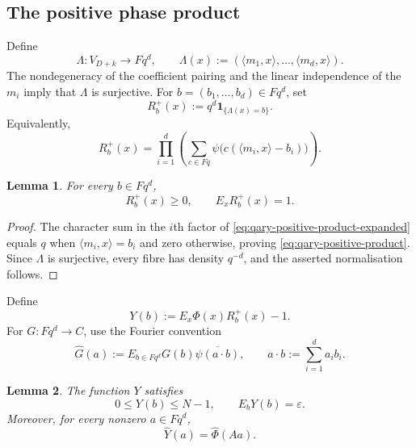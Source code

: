 \documentclass[11pt,reqno]{amsart}
\numberwithin{equation}{section}
\newtheorem{lemma}[lemma]{Lemma}
\theoremstyle{definition}
\theoremstyle{remark}
\newcommand{\Fq}{\mathbb F_q}
\newcommand{\E}{\mathbb E}
\newcommand{\one}{\mathbf 1}
\newcommand{\eps}{\varepsilon}
\newcommand{\wh}{\widehat}
\newcommand{\angles}[1]{\langle#1\rangle}
\def\Fq{Fq}%
\def\mathbb#1{#1}%
\begin{document}
\subsection{The positive phase product}

Define
\begin{equation}\label{eq:Lambda-def}
 \Lambda:V_{D+k}\longrightarrow\Fq^d,
 \qquad
 \Lambda(x):=
 (\angles{m_1,x},\ldots,\angles{m_d,x}).
\end{equation}
The nondegeneracy of the coefficient pairing and the linear independence of the $m_i$ imply that $\Lambda$ is surjective.  For $b=(b_1,\ldots,b_d)\in\Fq^d$, set
\begin{equation}\label{eq:qary-positive-product}
 R_b^+(x)
 :=q^d\one_{\{\Lambda(x)=b\}}.
\end{equation}
Equivalently,
\begin{equation}\label{eq:qary-positive-product-expanded}
 R_b^+(x)
 =\prod_{i=1}^d
 \left(
   \sum_{c\in\Fq}
   \psi\bigl(c(\angles{m_i,x}-b_i)\bigr)
 \right).
\end{equation}

\begin{lemma}\label{lem:qary-positive}
For every $b\in\Fq^d$,
\[
 R_b^+(x)\ge0,
 \qquad
 \E_xR_b^+(x)=1.
\]
\end{lemma}

\begin{proof}
The character sum in the $i$th factor of
\eqref{eq:qary-positive-product-expanded} equals $q$ when
$\angles{m_i,x}=b_i$ and zero otherwise, proving
\eqref{eq:qary-positive-product}.  Since $\Lambda$ is surjective, every fibre has density $q^{-d}$, and the asserted normalisation follows.
\end{proof}

Define
\begin{equation}\label{eq:Y-def}
 Y(b):=\E_x\Phi(x)R_b^+(x)-1.
\end{equation}
For $G:\Fq^d\to\mathbb C$, use the Fourier convention
\begin{equation}\label{eq:phase-Fourier}
 \wh G(a)
 :=\E_{b\in\Fq^d}
 G(b)\overline{\psi(a\cdot b)},
 \qquad
 a\cdot b:=\sum_{i=1}^da_ib_i.
\end{equation}

\begin{lemma}\label{lem:Y-small}
The function $Y$ satisfies
\begin{equation}\label{eq:Y-small}
 0\le Y(b)\le N-1,
 \qquad
 \E_bY(b)=\eps.
\end{equation}
Moreover, for every nonzero $a\in\Fq^d$,
\begin{equation}\label{eq:qary-phase-identification}
 \wh Y(a)=\wh\Phi(Aa).
\end{equation}
\end{lemma}
\end{document}
